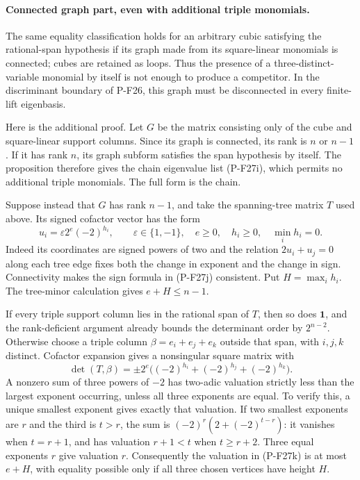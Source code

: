 \documentclass[11pt,a4paper]{article}
\begin{document}
\paragraph{Connected graph part, even with additional triple monomials.}
The same equality classification holds for an arbitrary cubic satisfying
the rational-span hypothesis if its graph made from its square-linear
monomials is connected; cubes are retained as loops. Thus the presence
of a three-distinct-variable monomial by itself is not enough to produce
a competitor. In the discriminant boundary of P-F26, this graph must be
disconnected in every finite-lift eigenbasis.

Here is the additional proof. Let $G$ be the matrix consisting only
of the cube and square-linear support columns. Since its graph is
connected, its rank is $n$ or $n-1$. If it has rank $n$, its graph
subform satisfies the span hypothesis by itself. The proposition
therefore gives the chain eigenvalue list (P-F27i), which permits no
additional triple monomials. The full form is the chain.

Suppose instead that $G$ has rank $n-1$, and take the spanning-tree
matrix $T$ used above. Its signed cofactor vector has the form
\[
 u_i=\varepsilon 2^e(-2)^{h_i},\qquad
 \varepsilon\in\{1,-1\},\quad e\ge0,\quad
 h_i\ge0,\quad \min_i h_i=0.
 \tag{P-F27j}
\]
Indeed its coordinates are signed powers of two and the relation
$2u_i+u_j=0$ along each tree edge fixes both the change in exponent
and the change in sign. Connectivity makes the sign formula in
(P-F27j) consistent. Put $H=\max_i h_i$. The tree-minor calculation
gives $e+H\le n-1$.

If every triple support column lies in the rational span of $T$,
then so does $\mathbf1$, and the rank-deficient argument already
bounds the determinant order by $2^{n-2}$. Otherwise choose a triple
column $\beta=e_i+e_j+e_k$ outside that span, with $i,j,k$ distinct.
Cofactor expansion gives a nonsingular square matrix with
\[
 \det(T,\beta)=\pm 2^e
       \bigl((-2)^{h_i}+(-2)^{h_j}+(-2)^{h_k}\bigr).
 \tag{P-F27k}
\]
A nonzero sum of three powers of $-2$ has two-adic valuation strictly
less than the largest exponent occurring, unless all three exponents
are equal. To verify this, a unique smallest exponent gives exactly
that valuation. If two smallest exponents are $r$ and the third is
$t>r$, the sum is $(-2)^r(2+(-2)^{t-r})$: it vanishes when $t=r+1$,
and has valuation $r+1<t$ when $t\ge r+2$. Three equal exponents
$r$ give valuation $r$. Consequently the valuation in (P-F27k) is
at most $e+H$, with equality possible only if all three chosen
vertices have height $H$.
\end{document}
